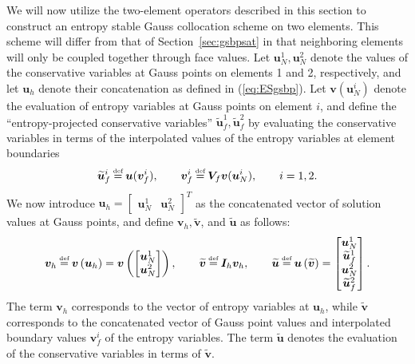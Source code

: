 \documentclass[onefignum,onetabnum,final]{siamart171218}
\renewcommand{\tilde}{\widetilde}
\newcommand{\LRp}[1]{\left( #1 \right)}
\newcommand\myeq{\mathrel{\stackrel{\makebox[0pt]{\mbox{\normalfont\tiny def}}}{=}}}
\begin{document}
We will now utilize the two-element operators described in this section to construct an entropy stable Gauss collocation scheme on two elements.  This scheme will differ from that of Section~\ref{sec:gsbpsat} in that neighboring elements will only be coupled together through face values.  
Let $\bm{u}^1_N, \bm{u}^2_N$ denote the values of the conservative variables at Gauss points on elements 1 and 2, respectively, and let $\bm{u}_h$ denote their concatenation as defined in (\ref{eq:ESgsbp}).  Let $\bm{v}(\bm{u}^i_N)$ denote the evaluation of entropy variables at Gauss points on element $i$, and define the ``entropy-projected conservative variables'' $\tilde{\bm{u}}^1_f, \tilde{\bm{u}}^2_f$ by evaluating the conservative variables in terms of the  interpolated values of the entropy variables at element boundaries 
\[
\tilde{\bm{u}}^i_f \myeq \bm{u}(\bm{v}^i_f), \qquad \bm{v}^i_f \myeq \bm{V}_f\bm{v}(\bm{u}^i_N), \qquad i = 1,2. 
\]
We now introduce $\bm{u}_h = \begin{bmatrix}\bm{u}^1_N & \bm{u}^2_N\end{bmatrix}^T$ as the concatenated vector of solution values at Gauss points, and define $\bm{v}_h, \tilde{\bm{v}}$, and $\tilde{\bm{u}}$ as follows:  
\[
\bm{v}_h \myeq \bm{v}\LRp{\bm{u}_h} = \bm{v}\LRp{\begin{bmatrix}
{\bm{u}^1_N}\\
{\bm{u}^2_N}
\end{bmatrix}}, \qquad \tilde{\bm{v}} \myeq \bm{I}_h\bm{v}_h, \qquad \tilde{\bm{u}} \myeq \bm{u}\LRp{\tilde{\bm{v}}} = 
\begin{bmatrix}
\bm{u}^1_N \\
\tilde{\bm{u}}^1_f \\
\bm{u}^2_N \\
\tilde{\bm{u}}^2_f
\end{bmatrix}.  
\]
The term $\bm{v}_h$ corresponds to the vector of entropy variables at $\bm{u}_h$, while $\tilde{\bm{v}}$ corresponds to the concatenated vector of Gauss point values and interpolated boundary values $\bm{v}^i_f$ of the entropy variables.  The term $\tilde{\bm{u}}$ denotes the evaluation of the conservative variables in terms of $\tilde{\bm{v}}$.  
\end{document}
